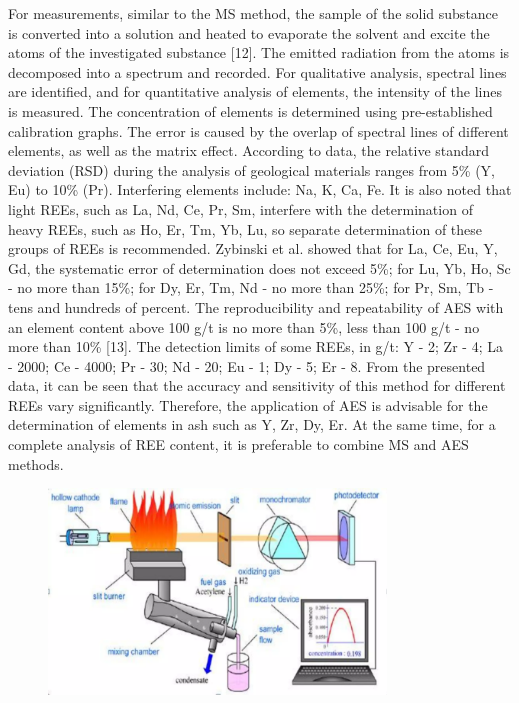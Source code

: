 For measurements, similar to the MS method, the sample of the solid
substance is converted into a solution and heated to evaporate the
solvent and excite the atoms of the investigated substance {[}12{]}. The
emitted radiation from the atoms is decomposed into a spectrum and
recorded. For qualitative analysis, spectral lines are identified, and
for quantitative analysis of elements, the intensity of the lines is
measured. The concentration of elements is determined using
pre-established calibration graphs. The error is caused by the overlap
of spectral lines of different elements, as well as the matrix effect.
According to data, the relative standard deviation (RSD) during the
analysis of geological materials ranges from 5\% (Y, Eu) to 10\% (Pr).
Interfering elements include: Na, K, Ca, Fe. It is also noted that light
REEs, such as La, Nd, Ce, Pr, Sm, interfere with the determination of
heavy REEs, such as Ho, Er, Tm, Yb, Lu, so separate determination of
these groups of REEs is recommended. Zybinski et al. showed that for La,
Ce, Eu, Y, Gd, the systematic error of determination does not exceed
5\%; for Lu, Yb, Ho, Sc - no more than 15\%; for Dy, Er, Tm, Nd - no
more than 25\%; for Pr, Sm, Tb - tens and hundreds of percent. The
reproducibility and repeatability of AES with an element content above
100 g/t is no more than 5\%, less than 100 g/t - no more than 10\%
{[}13{]}. The detection limits of some REEs, in g/t: Y - 2; Zr - 4; La -
2000; Ce - 4000; Pr - 30; Nd - 20; Eu - 1; Dy - 5; Er - 8. From the
presented data, it can be seen that the accuracy and sensitivity of this
method for different REEs vary significantly. Therefore, the application
of AES is advisable for the determination of elements in ash such as Y,
Zr, Dy, Er. At the same time, for a complete analysis of REE content, it
is preferable to combine MS and AES methods.

\begin{figure}[H]
	\centering
	\includegraphics[width=0.8\textwidth]{assets/1050}
	\caption*{}
\end{figure}

